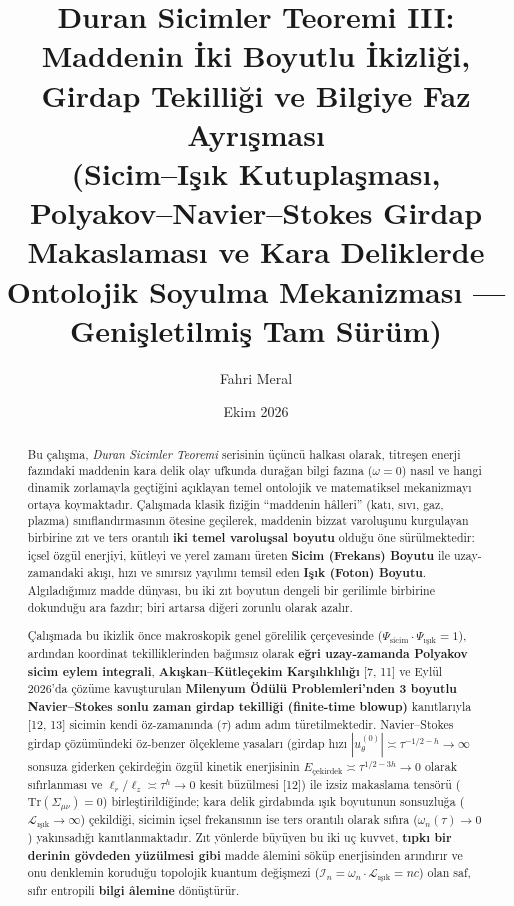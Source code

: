 \documentclass[12pt,a4paper]{article}
\title{\textbf{Duran Sicimler Teoremi III: Maddenin İki Boyutlu İkizliği, Girdap Tekilliği ve Bilgiye Faz Ayrışması} \\[0.3cm]
\large (Sicim--Işık Kutuplaşması, Polyakov--Navier--Stokes Girdap Makaslaması ve Kara Deliklerde Ontolojik Soyulma Mekanizması — Genişletilmiş Tam Sürüm)}
\author{Fahri Meral}
\date{Ekim 2026}
\begin{document}
\shorthandoff{=}

\maketitle

\begin{abstract}
Bu çalışma, \textit{Duran Sicimler Teoremi} serisinin üçüncü halkası olarak, titreşen enerji fazındaki maddenin kara delik olay ufkunda durağan bilgi fazına ($\omega = 0$) nasıl ve hangi dinamik zorlamayla geçtiğini açıklayan temel ontolojik ve matematiksel mekanizmayı ortaya koymaktadır. Çalışmada klasik fiziğin ``maddenin hâlleri'' (katı, sıvı, gaz, plazma) sınıflandırmasının ötesine geçilerek, maddenin bizzat varoluşunu kurgulayan birbirine zıt ve ters orantılı \textbf{iki temel varoluşsal boyutu} olduğu öne sürülmektedir: içsel özgül enerjiyi, kütleyi ve yerel zamanı üreten \textbf{Sicim (Frekans) Boyutu} ile uzay-zamandaki akışı, hızı ve sınırsız yayılımı temsil eden \textbf{Işık (Foton) Boyutu}. Algıladığımız madde dünyası, bu iki zıt boyutun dengeli bir gerilimle birbirine dokunduğu ara fazdır; biri artarsa diğeri zorunlu olarak azalır.

Çalışmada bu ikizlik önce makroskopik genel görelilik çerçevesinde ($\Psi_{\text{sicim}} \cdot \Psi_{\text{ışık}} = 1$), ardından koordinat tekilliklerinden bağımsız olarak \textbf{eğri uzay-zamanda Polyakov sicim eylem integrali}, \textbf{Akışkan--Kütleçekim Karşılıklılığı} [7, 11] ve Eylül 2026'da çözüme kavuşturulan \textbf{Milenyum Ödülü Problemleri'nden 3 boyutlu Navier--Stokes sonlu zaman girdap tekilliği (finite-time blowup)} kanıtlarıyla [12, 13] sicimin kendi öz-zamanında ($\tau$) adım adım türetilmektedir. Navier--Stokes girdap çözümündeki öz-benzer ölçekleme yasaları (girdap hızı $|u_\theta^{(0)}| \asymp \tau^{-1/2-h} \to \infty$ sonsuza giderken çekirdeğin özgül kinetik enerjisinin $E_{\text{çekirdek}} \asymp \tau^{1/2-3h} \to 0$ olarak sıfırlanması ve $\ell_r/\ell_z \asymp \tau^h \to 0$ kesit büzülmesi [12]) ile izsiz makaslama tensörü ($\text{Tr}(\Sigma_{\mu\nu})=0$) birleştirildiğinde; kara delik girdabında ışık boyutunun sonsuzluğa ($\mathcal{L}_{\text{ışık}} \to \infty$) çekildiği, sicimin içsel frekansının ise ters orantılı olarak sıfıra ($\omega_n(\tau) \to 0$) yakınsadığı kanıtlanmaktadır. Zıt yönlerde büyüyen bu iki uç kuvvet, \textbf{tıpkı bir derinin gövdeden yüzülmesi gibi} madde âlemini söküp enerjisinden arındırır ve onu denklemin koruduğu topolojik kuantum değişmezi ($\mathcal{I}_n = \omega_n \cdot \mathcal{L}_{\text{ışık}} = n c$) olan saf, sıfır entropili \textbf{bilgi âlemine} dönüştürür.
\end{abstract}
\end{document}
